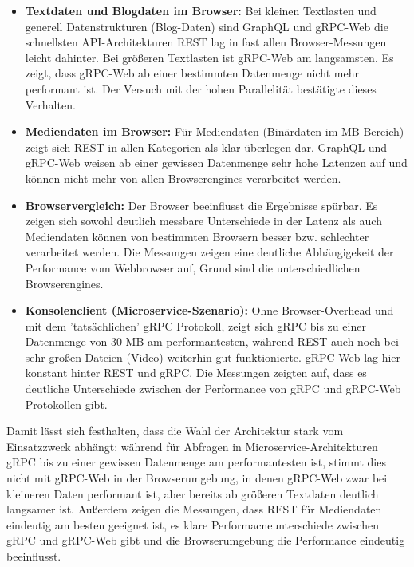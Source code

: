 \begin{itemize}
	\item \textbf{Textdaten und Blogdaten im Browser:} Bei kleinen Textlasten und generell Datenstrukturen (Blog-Daten) sind GraphQL und gRPC-Web die schnellsten API-Architekturen REST lag in fast allen Browser-Messungen leicht dahinter. Bei größeren Textlasten ist gRPC-Web am langsamsten. Es zeigt, dass gRPC-Web ab einer bestimmten Datenmenge nicht mehr performant ist. Der Versuch mit der hohen Parallelität bestätigte dieses Verhalten.
	\item \textbf{Mediendaten im Browser:} Für Mediendaten (Binärdaten im MB Bereich) zeigt sich REST in allen Kategorien als klar überlegen dar. GraphQL und gRPC-Web weisen ab einer gewissen Datenmenge sehr hohe Latenzen auf und können nicht mehr von allen Browserengines verarbeitet werden.
	
	\item \textbf{Browservergleich:} Der Browser beeinflusst die Ergebnisse spürbar. Es zeigen sich sowohl deutlich messbare Unterschiede in der Latenz als auch Mediendaten können von bestimmten Browsern besser bzw. schlechter verarbeitet werden. Die Messungen zeigen eine deutliche Abhängigekeit der Performance vom Webbrowser auf, Grund sind die unterschiedlichen Browserengines.
	
	\item \textbf{Konsolenclient (Microservice-Szenario):} Ohne Browser-Overhead und mit dem 'tatsächlichen' gRPC Protokoll, zeigt sich gRPC bis zu einer Datenmenge von 30 MB am performantesten, während REST auch noch bei sehr großen Dateien (Video) weiterhin gut funktionierte. gRPC-Web lag hier konstant hinter REST und gRPC. Die Messungen zeigten auf, dass es deutliche Unterschiede zwischen der Performance von gRPC und gRPC-Web Protokollen gibt.
\end{itemize}

Damit lässt sich festhalten, dass die Wahl der Architektur stark vom Einsatzzweck abhängt: während für Abfragen in Microservice-Architekturen gRPC bis zu einer gewissen Datenmenge am performantesten ist, stimmt dies nicht mit gRPC-Web in der Browserumgebung, in denen gRPC-Web zwar bei kleineren Daten performant ist, aber bereits ab größeren Textdaten deutlich langsamer ist. Außerdem zeigen die Messungen, dass REST für Mediendaten eindeutig am besten geeignet ist, es klare Performacneunterschiede zwischen gRPC und gRPC-Web gibt und die Browserumgebung die Performance eindeutig beeinflusst.

\chapterend